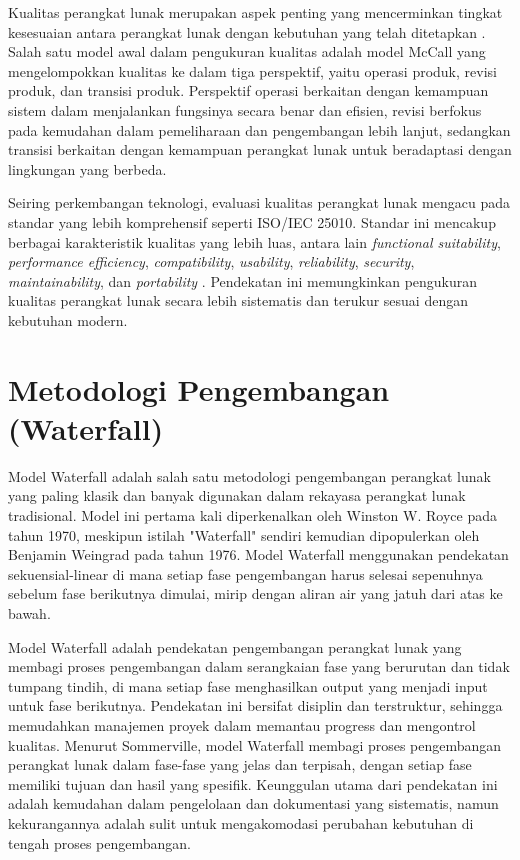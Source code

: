 \documentclass[12pt,a4paper,twoside]{report}
\begin{document}
Kualitas perangkat lunak merupakan aspek penting yang mencerminkan tingkat kesesuaian antara perangkat lunak dengan kebutuhan yang telah ditetapkan \cite{pressman2014}. Salah satu model awal dalam pengukuran kualitas adalah model McCall yang mengelompokkan kualitas ke dalam tiga perspektif, yaitu operasi produk, revisi produk, dan transisi produk. Perspektif operasi berkaitan dengan kemampuan sistem dalam menjalankan fungsinya secara benar dan efisien, revisi berfokus pada kemudahan dalam pemeliharaan dan pengembangan lebih lanjut, sedangkan transisi berkaitan dengan kemampuan perangkat lunak untuk beradaptasi dengan lingkungan yang berbeda.

Seiring perkembangan teknologi, evaluasi kualitas perangkat lunak mengacu pada standar yang lebih komprehensif seperti ISO/IEC 25010. Standar ini mencakup berbagai karakteristik kualitas yang lebih luas, antara lain \textit{functional suitability}, \textit{performance efficiency}, \textit{compatibility}, \textit{usability}, \textit{reliability}, \textit{security}, \textit{maintainability}, dan \textit{portability} \cite{sarwosri2023}. Pendekatan ini memungkinkan pengukuran kualitas perangkat lunak secara lebih sistematis dan terukur sesuai dengan kebutuhan modern.

\section{Metodologi Pengembangan (Waterfall)}

Model Waterfall adalah salah satu metodologi pengembangan perangkat lunak yang paling klasik dan banyak digunakan dalam rekayasa perangkat lunak tradisional. Model ini pertama kali diperkenalkan oleh Winston W. Royce pada tahun 1970, meskipun istilah "Waterfall" sendiri kemudian dipopulerkan oleh Benjamin Weingrad pada tahun 1976. Model Waterfall menggunakan pendekatan sekuensial-linear di mana setiap fase pengembangan harus selesai sepenuhnya sebelum fase berikutnya dimulai, mirip dengan aliran air yang jatuh dari atas ke bawah\cite{thesing2021}.

Model Waterfall adalah pendekatan pengembangan perangkat lunak yang membagi proses pengembangan dalam serangkaian fase yang berurutan dan tidak tumpang tindih, di mana setiap fase menghasilkan output yang menjadi input untuk fase berikutnya\cite{pressman2014}. Pendekatan ini bersifat disiplin dan terstruktur, sehingga memudahkan manajemen proyek dalam memantau progress dan mengontrol kualitas. Menurut Sommerville, model Waterfall membagi proses pengembangan perangkat lunak dalam fase-fase yang jelas dan terpisah, dengan setiap fase memiliki tujuan dan hasil yang spesifik. Keunggulan utama dari pendekatan ini adalah kemudahan dalam pengelolaan dan dokumentasi yang sistematis, namun kekurangannya adalah sulit untuk mengakomodasi perubahan kebutuhan di tengah proses pengembangan.
\end{document}
